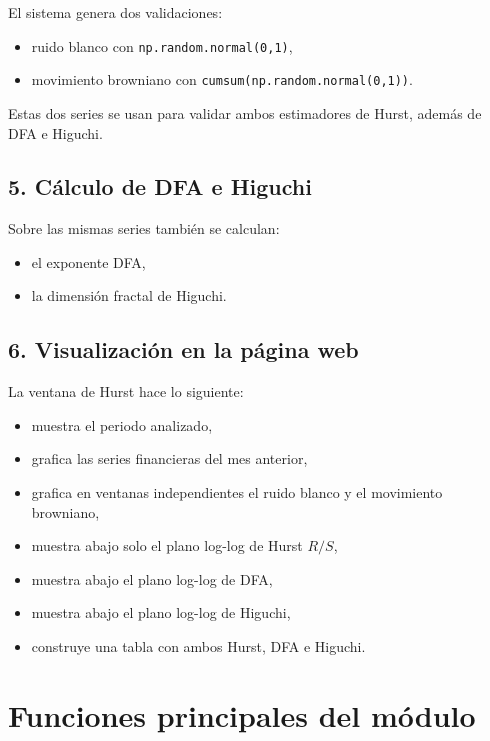\documentclass[12pt,a4paper]{article}
\begin{document}
El sistema genera dos validaciones:

\begin{itemize}
    \item ruido blanco con \texttt{np.random.normal(0,1)},
    \item movimiento browniano con \texttt{cumsum(np.random.normal(0,1))}.
\end{itemize}

Estas dos series se usan para validar ambos estimadores de Hurst, además de DFA e Higuchi.

\subsection{5. Cálculo de DFA e Higuchi}

Sobre las mismas series también se calculan:

\begin{itemize}
    \item el exponente DFA,
    \item la dimensión fractal de Higuchi.
\end{itemize}

\subsection{6. Visualización en la página web}

La ventana de Hurst hace lo siguiente:

\begin{itemize}
    \item muestra el periodo analizado,
    \item grafica las series financieras del mes anterior,
    \item grafica en ventanas independientes el ruido blanco y el movimiento browniano,
    \item muestra abajo solo el plano log-log de Hurst \(R/S\),
    \item muestra abajo el plano log-log de DFA,
    \item muestra abajo el plano log-log de Higuchi,
    \item construye una tabla con ambos Hurst, DFA e Higuchi.
\end{itemize}

\section{Funciones principales del módulo}
\end{document}
